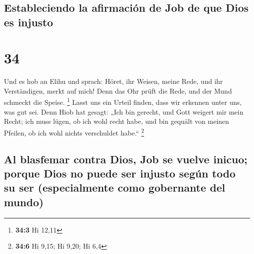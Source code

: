 \hypertarget{estableciendo-la-afirmaciuxf3n-de-job-de-que-dios-es-injusto}{%
\subsection{Estableciendo la afirmación de Job de que Dios es
injusto}\label{estableciendo-la-afirmaciuxf3n-de-job-de-que-dios-es-injusto}}

\hypertarget{section-33}{%
\section{34}\label{section-33}}

 Und es hob an Elihu und sprach:  Höret, ihr
Weisen, meine Rede, und ihr Verständigen, merkt auf mich! 
Denn das Ohr prüft die Rede, und der Mund schmeckt die Speise.
\footnote{\textbf{34:3} Hi 12,11}  Lasst uns ein Urteil
finden, dass wir erkennen unter uns, was gut sei.  Denn
Hiob hat gesagt: „Ich bin gerecht, und Gott weigert mir mein Recht;
 ich muss lügen, ob ich wohl recht habe, und bin gequält
von meinen Pfeilen, ob ich wohl nichts verschuldet habe.`` \footnote{\textbf{34:6}
  Hi 9,15; Hi 9,20; Hi 6,4}

\hypertarget{al-blasfemar-contra-dios-job-se-vuelve-inicuo-porque-dios-no-puede-ser-injusto-seguxfan-todo-su-ser-especialmente-como-gobernante-del-mundo}{%
\subsection{Al blasfemar contra Dios, Job se vuelve inicuo; porque Dios
no puede ser injusto según todo su ser (especialmente como gobernante
del
mundo)}\label{al-blasfemar-contra-dios-job-se-vuelve-inicuo-porque-dios-no-puede-ser-injusto-seguxfan-todo-su-ser-especialmente-como-gobernante-del-mundo}}

